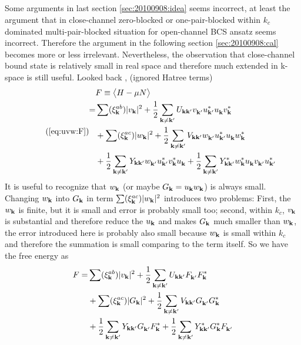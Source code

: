 \subsection{}
Some arguments in last section \ref{sec:20100908:idea} seems incorrect, at least the argument that in close-channel zero-blocked  or one-pair-blocked within $k_{c}$ dominated multi-pair-blocked situation for open-channel BCS ansatz seems incorrect.  Therefore the argument in the following section \ref{sec:20100908:cal} becomes more or less irrelevant.  Nevertheless, the observation that close-channel bound state is relatively small in real space and therefore much extended in k-space is still useful.  Looked back , (ignored Hatree terms)
\begin{equation}\tag{\ref{eq:uvw:F}}
 \begin{split}
  &F\equiv\av{H-\mu{}N}\\
    =&\sum(\xi^{ab}_\vk)\abs{v_\vk}^2+\nth2\sum_{\vk\neq\vk'}U_{\vk\vk'}v^{}_{\vk'}u^*_{\vk'}u^{}_\vk{}v^*_\vk\\
    &+\sum(\xi^{ac}_\vk)\abs{w_\vk}^2
      +\nth2\sum_{\vk\neq\vk'}V_{\vk\vk'}w^{}_{\vk'}u^*_{\vk'}u^{}_\vk{}w^*_\vk\\
    &  +\nth2\sum_{\vk\neq\vk'}Y_{\vk\vk'}w^{}_{\vk'}{u^{*}_{\vk'}}v^*_\vk{}u^{}_\vk
        +\nth2\sum_{\vk\neq\vk'}Y^*_{\vk\vk'}w^*_{\vk}{u^{}_{\vk}}v^{}_{\vk'}{}u^{*}_{\vk'}
 \end{split}
\end{equation}
It is useful to recognize that $w_{\mathbf{k}}$ (or maybe $G_{\mathbf{k}}=u_{\mathbf{k}}w_{\mathbf{k}}$) is always small. Changing  $w_{\mathbf{k}}$ into $G_{\mathbf{k}}$ in term $\sum(\xi^{ac}_{\mathbf{k}})\lvert{w_{\ensuremath{\mathbf{k}}}}\rvert^2$ introduces two problems:  First, the $w_{\mathbf{k}}$ is finite, but it is small and error is probably small too;  second, within $k_{c}$, $v_{\mathbf{k}}$ is substantial and therefore reduce the $u_{\mathbf{k}}$ and makes $G_{\mathbf{k}}$ much smaller than $w_{\mathbf{k}}$, the error introduced here is probably also small because $w_{\mathbf{k}}$ is small within $k_{c}$ and therefore the summation is small comparing to the term itself.  
So we have the free energy as 
\begin{equation}\label{eq:20100909:F}
 \begin{split}
    F=&\sum(\xi^{ab}_{\mathbf{k}})\lvert{v_{\ensuremath{\mathbf{k}}}}\rvert^2+\frac{1}{2}\sum_{\mathbf{k}\neq\mathbf{k}'}U_{\mathbf{k}\mathbf{k}'}F^{}_{\mathbf{k}'}F^*_{\mathbf{k}}\\
    &+\sum(\xi^{ac}_{\mathbf{k}})\lvert{G_{\ensuremath{\mathbf{k}}}}\rvert^2
      +\frac{1}{2}\sum_{\mathbf{k}\neq\mathbf{k}'}V_{\mathbf{k}\mathbf{k}'}G^{}_{\mathbf{k}'}G^*_{\mathbf{k}}\\
    &  +\frac{1}{2}\sum_{\mathbf{k}\neq\mathbf{k}'}Y_{\mathbf{k}\mathbf{k}'}G^{}_{\mathbf{k}'}F^*_{\mathbf{k}}{}
        +\frac{1}{2}\sum_{\mathbf{k}\neq\mathbf{k}'}Y^*_{\mathbf{k}\mathbf{k}'}G^*_{\mathbf{k}}F^{}_{\mathbf{k}'}
 \end{split}
\end{equation}
